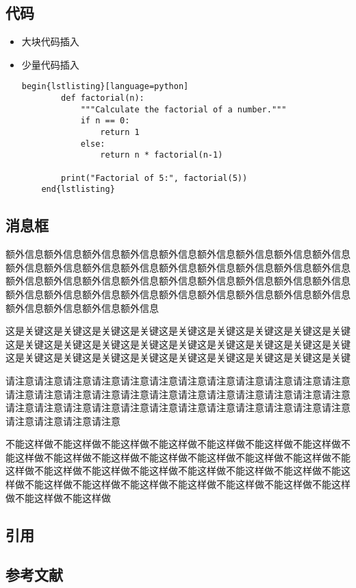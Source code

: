 \subsection{代码}
\begin{itemize}
    \item 大块代码插入
    
    \item 少量代码插入
    \begin{lstlisting}[language={[LaTeX]TeX}]
    begin{lstlisting}[language=python]
        def factorial(n):
            """Calculate the factorial of a number."""
            if n == 0:
                return 1
            else:
                return n * factorial(n-1)

        print("Factorial of 5:", factorial(5))        
    end{lstlisting}
    \end{lstlisting}
\end{itemize}
\subsection{消息框}

\begin{info}
    额外信息额外信息额外信息额外信息额外信息额外信息额外信息额外信息额外信息额外信息额外信息额外信息额外信息额外信息额外信息额外信息额外信息额外信息额外信息额外信息额外信息额外信息额外信息额外信息额外信息额外信息额外信息额外信息额外信息额外信息额外信息额外信息额外信息额外信息额外信息额外信息额外信息额外信息额外信息额外信息
\end{info}

\begin{keypoint}
    这是关键这是关键这是关键这是关键这是关键这是关键这是关键这是关键这是关键这是关键这是关键这是关键这是关键这是关键这是关键这是关键这是关键这是关键这是关键这是关键这是关键这是关键这是关键这是关键这是关键这是关键这是关键
\end{keypoint}

\begin{attention}
    请注意请注意请注意请注意请注意请注意请注意请注意请注意请注意请注意请注意请注意请注意请注意请注意请注意请注意请注意请注意请注意请注意请注意请注意请注意请注意请注意请注意请注意请注意请注意请注意请注意请注意请注意请注意请注意请注意请注意请注意
\end{attention}

\begin{ban}
    不能这样做不能这样做不能这样做不能这样做不能这样做不能这样做不能这样做不能这样做不能这样做不能这样做不能这样做不能这样做不能这样做不能这样做不能这样做不能这样做不能这样做不能这样做不能这样做不能这样做不能这样做不能这样做不能这样做不能这样做不能这样做不能这样做不能这样做不能这样做不能这样做不能这样做不能这样做
\end{ban}

\subsection{引用}
\subsection{参考文献}


